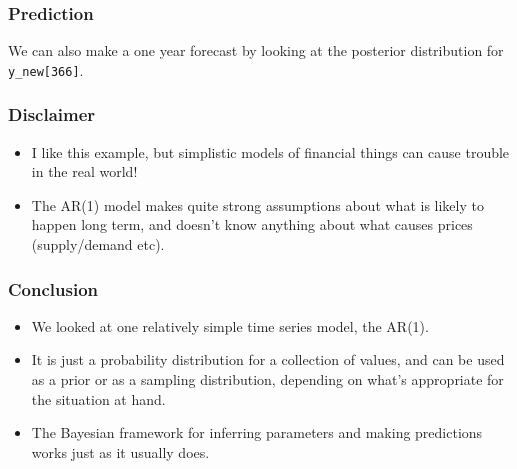 \documentclass{beamer}
\begin{document}
\begin{frame}[fragile]
\frametitle{Prediction}
We can also make a one year forecast by looking at the posterior
distribution for \texttt{y_new[366]}.

\end{frame}

\begin{frame}[fragile]
\frametitle{Disclaimer}

\begin{itemize}
\item I like this example, but simplistic models of financial
things can cause trouble in the real world!\pause
\item The AR(1) model makes quite strong assumptions about
what is likely to happen long term, and doesn't know
anything about what causes prices (supply/demand etc).
\end{itemize}

\end{frame}


\begin{frame}
\frametitle{Conclusion}

\begin{itemize}
\item We looked at one relatively simple time series model, the AR(1).\pause
\item It is just a probability distribution for a collection of values,
and can be used as a prior or as a sampling distribution, depending on what's
appropriate for the situation at hand.\pause
\item The Bayesian framework for inferring parameters and making predictions
works just as it usually does.
\end{itemize}

\end{frame}
\end{document}
